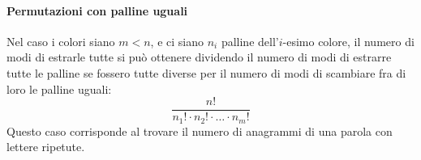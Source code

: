 \documentclass{article}
\theoremstyle{plain}
\theoremstyle{definition}
\theoremstyle{remark}
\begin{document}
\paragraph{Permutazioni con palline uguali} %
\label{par:permutazioni_con_palline_uguali}
Nel caso i colori siano $m<n$, e ci siano $n_i$ palline dell'$i$-esimo colore, il numero di modi di estrarle tutte si può ottenere dividendo il numero di modi di estrarre tutte le palline se fossero tutte diverse per il numero di modi di scambiare fra di loro le palline uguali:
\begin{equation*}
	\frac{n!}{n_1!\cdot n_2!\cdot\ldots\cdot n_m!}
\end{equation*}
Questo caso corrisponde al trovare il numero di anagrammi di una parola con lettere ripetute.
\end{document}
